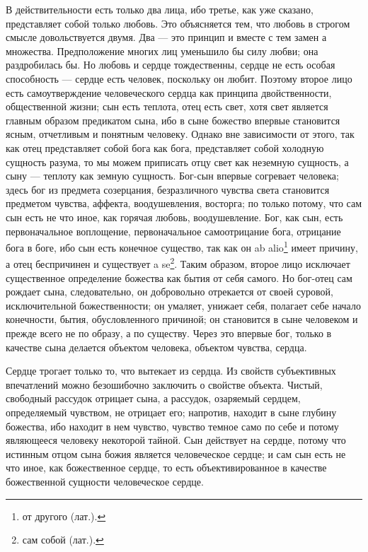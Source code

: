 \documentclass[12pt,oneside]{book}
\begin{document}
В действительности есть только два лица, ибо третье, как уже сказано, представляет собой только любовь. Это объясняется тем, что любовь в строгом смысле довольствуется двумя. Два --- это принцип и вместе с тем замен а множества. Предположение многих лиц уменьшило бы силу любви; она раздробилась бы. Но любовь и сердце тождественны, сердце не есть особая способность --- сердце есть человек, поскольку он любит. Поэтому второе лицо есть самоутверждение человеческого сердца как принципа двойственности, общественной жизни; сын есть теплота, отец есть свет, хотя свет является главным образом предикатом сына, ибо в сыне божество впервые становится ясным, отчетливым и понятным человеку. Однако вне зависимости от этого, так как отец представляет собой бога как бога, представляет собой холодную сущность разума, то мы можем приписать отцу свет как неземную сущность, а сыну --- теплоту как земную сущность. Бог-сын впервые согревает человека; здесь бог из предмета созерцания, безразличного чувства света становится предметом чувства, аффекта, воодушевления, восторга; по только потому, что сам сын есть не что иное, как горячая любовь, воодушевление. Бог, как сын, есть первоначальное воплощение, первоначальное самоотрицание бога, отрицание бога в боге, ибо сын есть конечное существо, так как он ab alio\footnote{от другого (лат.).} имеет причину, а отец беспричинен и существует a se\footnote{сам собой (лат.).}. Таким образом, второе лицо исключает существенное определение божества как бытия от себя самого. Но бог-отец сам рождает сына, следовательно, он добровольно отрекается от своей суровой, исключительной божественности; он умаляет, унижает себя, полагает себе начало конечности, бытия, обусловленного причиной; он становится в сыне человеком и прежде всего не по образу, а по существу. Через это впервые бог, только в качестве сына делается объектом человека, объектом чувства, сердца.

Сердце трогает только то, что вытекает из сердца. Из свойств субъективных впечатлений можно безошибочно заключить о свойстве объекта. Чистый, свободный рассудок отрицает сына, а рассудок, озаряемый сердцем, определяемый чувством, не отрицает его; напротив, находит в сыне глубину божества, ибо находит в нем чувство, чувство темное само по себе и потому являющееся человеку некоторой тайной. Сын действует на сердце, потому что истинным отцом сына божия является человеческое сердце\dag\let\svthefootnote\thefootnote\let\thefootnote\relax{}\let\thefootnote\svthefootnote; и сам сын есть не что иное, как божественное сердце, то есть объективированное в качестве божественной сущности человеческое сердце.
\end{document}
